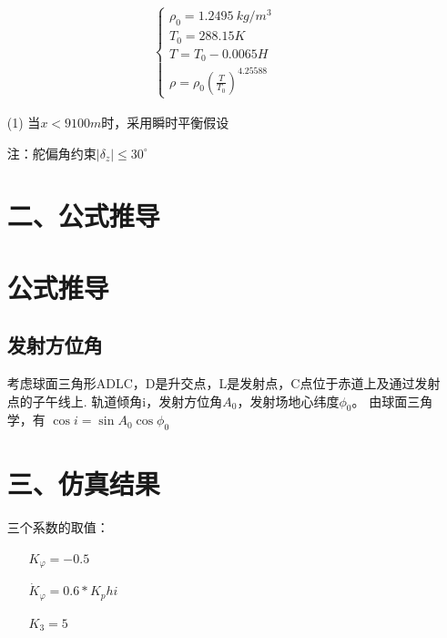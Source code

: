 \documentclass[forprint]{NWPUBachelor}
\begin{document}
\begin{align}
    \begin{cases}
        \rho_0=1.2495\ kg/m^3 \\
        T_0=288.15   K        \\
        T=T_0-0.0065H         \\
        \rho=\rho_{0}\left( \frac{T}{T_{0}} \right)^{4.25588}
    \end{cases}
\end{align}


\begin{itemize}
    \item[(1)] 当$x<9100m$时，采用瞬时平衡假设
        
注：舵偏角约束$\left|\delta_{z} \right|\leq 30^{\circ}$




\section*{ 二、公式推导}



\section{公式推导}

\subsection{发射方位角}

考虑球面三角形ADLC，D是升交点，L是发射点，C点位于赤道上及通过发射点的子午线上.
轨道倾角i，发射方位角$A_0$，发射场地心纬度$\phi_0$。
由球面三角学，有
$\cos{i}=\sin{A_0}\cos{\phi_0}$

\section*{ 三、仿真结果}

    
三个系数的取值：
    \begin{itemize}
        \item[]$K_\varphi = - 0.5$
        \item[]$\dot{K}_\varphi= 0.6* K_phi$
        \item[]$K_3= 5$
    \end{itemize}




\end{itemize}
\end{document}
